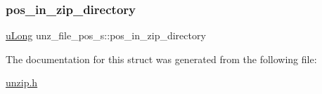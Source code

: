 \subsubsection{\texorpdfstring{pos\+\_\+in\+\_\+zip\+\_\+directory}{pos\_in\_zip\_directory}}
{\footnotesize\ttfamily \hyperlink{ioapi_8h_a50e9e9d5c30e481de822ad68fe537986}{u\+Long} unz\+\_\+file\+\_\+pos\+\_\+s\+::pos\+\_\+in\+\_\+zip\+\_\+directory}



The documentation for this struct was generated from the following file\+:\begin{DoxyCompactItemize}
\item 
\hyperlink{unzip_8h}{unzip.\+h}\end{DoxyCompactItemize}

